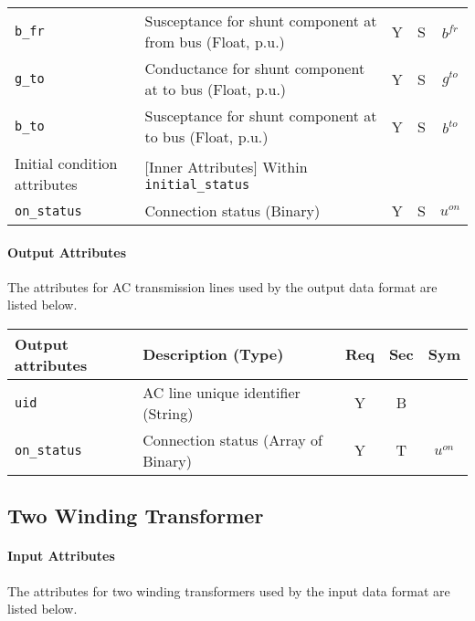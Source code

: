 \documentclass{article}
\begin{document}
\begin{center}
\begin{tabular}{ l | l | c | c | c | }
  {\tt b\_fr} & Susceptance for shunt component at from bus (Float, p.u.)& Y & S & $b^{fr}$\\
  {\tt g\_to} & Conductance for shunt component at to bus (Float, p.u.)& Y & S & $g^{to}$\\
  {\tt b\_to} & Susceptance for shunt component at to bus (Float, p.u.)& Y & S & $b^{to}$\\
  \hline
  Initial condition attributes & [Inner Attributes] Within {\tt initial\_status} & & & \\
  \hline
  {\tt on\_status} & Connection status (Binary) & Y & S & $u^{on}$ \\
  \hline
\end{tabular}
\end{center}

\paragraph{Output Attributes}
The attributes for AC transmission lines used by the output data format are listed below.
\begin{center}
\small
\begin{tabular}{ l | l | c | c | c |}
Output attributes & Description (Type)& Req & Sec & Sym\\
\hline
 {\tt uid} & AC line unique identifier (String)& Y & B & \\
 {\tt on\_status} & Connection status (Array of Binary) & Y & T & $u^{on}$ \\
\hline
\end{tabular}
\end{center}
\subsection{Two Winding Transformer}
\label{nom:transformer}

\paragraph{Input Attributes}
The attributes for two winding transformers used by the
input data format are listed below.
\end{document}
